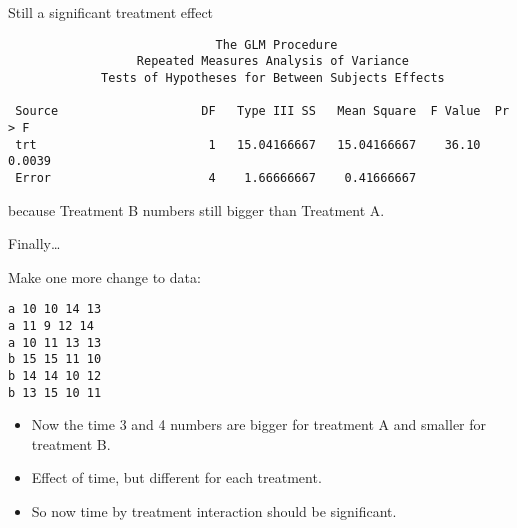 \documentclass[pdf]{prosper}
\begin{document}
  \begin{slide}{Still a significant treatment effect}

{\scriptsize
\begin{verbatim}
                             The GLM Procedure
                  Repeated Measures Analysis of Variance
             Tests of Hypotheses for Between Subjects Effects

 Source                    DF   Type III SS   Mean Square  F Value  Pr > F
 trt                        1   15.04166667   15.04166667    36.10  0.0039
 Error                      4    1.66666667    0.41666667                 

\end{verbatim}
}

because Treatment B numbers still bigger than Treatment A.

\end{slide}

\begin{slide}{Finally\ldots}

Make one more change to data:

\begin{verbatim}
a 10 10 14 13
a 11 9 12 14
a 10 11 13 13
b 15 15 11 10 
b 14 14 10 12
b 13 15 10 11 

\end{verbatim}

\begin{itemize}
\item Now the time 3 and 4 numbers are bigger for treatment A and
  smaller for treatment B. 
\item Effect of time, but 
  different for each treatment. 
\item So now time by treatment
  interaction should be significant.

\end{itemize}

    
  \end{slide}
\end{document}
